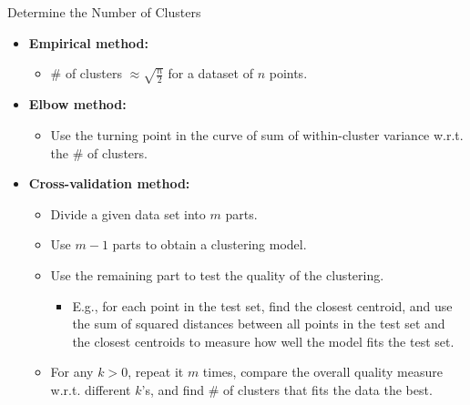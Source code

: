\begin{frame}{Determine the Number of Clusters}
	\begin{itemize}
		\item \textbf{Empirical method:}
		\begin{itemize}
			\item $\#$ of clusters $\approx \sqrt{\frac{n}{2}}$ for a dataset 
			of $n$ points.
		\end{itemize}
		\item \textbf{Elbow method:}
		\begin{itemize}
			\item Use the turning point in the curve of sum of within-cluster 
			variance w.r.t. the $\#$ of clusters.
		\end{itemize}
		\item \textbf{Cross-validation method:}
		\begin{itemize}
			\item Divide a given data set into $m$ parts.
			\item Use $m-1$ parts to obtain a clustering model.
			\item Use the remaining part to test the quality of the clustering.
			\begin{itemize}
				\item E.g., for each point in the test set, find the closest 
				centroid, and use the sum of squared distances between all 
				points in the test set and the closest centroids to measure how 
				well the model fits the test set.
			\end{itemize}
			\item For any $k > 0$, repeat it $m$ times, compare the overall 
			quality measure w.r.t. different $k$'s, and find $\#$ of clusters 
			that fits the data the best.
		\end{itemize}
	\end{itemize}
\end{frame}

